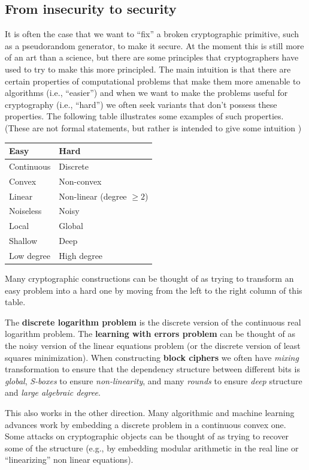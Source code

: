 \subsection{From insecurity to
security}\label{From-insecurity-to-security}

It is often the case that we want to ``fix'' a broken cryptographic
primitive, such as a pseudorandom generator, to make it secure. At the
moment this is still more of an art than a science, but there are some
principles that cryptographers have used to try to make this more
principled. The main intuition is that there are certain properties of
computational problems that make them more amenable to algorithms (i.e.,
``easier'') and when we want to make the problems useful for
cryptography (i.e., ``hard'') we often seek variants that don't possess
these properties. The following table illustrates some examples of such
properties. (These are not formal statements, but rather is intended to
give some intuition )

\begin{longtable}[]{@{}ll@{}}
\toprule
Easy & Hard\tabularnewline
\midrule
\endhead
Continuous & Discrete\tabularnewline
Convex & Non-convex\tabularnewline
Linear & Non-linear (degree \(\geq 2\))\tabularnewline
Noiseless & Noisy\tabularnewline
Local & Global\tabularnewline
Shallow & Deep\tabularnewline
Low degree & High degree\tabularnewline
\bottomrule
\end{longtable}

Many cryptographic constructions can be thought of as trying to
transform an easy problem into a hard one by moving from the left to the
right column of this table.

The \textbf{discrete logarithm problem} is the discrete version of the
continuous real logarithm problem. The \textbf{learning with errors
problem} can be thought of as the noisy version of the linear equations
problem (or the discrete version of least squares minimization). When
constructing \textbf{block ciphers} we often have \emph{mixing}
transformation to ensure that the dependency structure between different
bits is \emph{global}, \emph{S-boxes} to ensure \emph{non-linearity},
and many \emph{rounds} to ensure \emph{deep} structure and \emph{large
algebraic degree}.

This also works in the other direction. Many algorithmic and machine
learning advances work by embedding a discrete problem in a continuous
convex one. Some attacks on cryptographic objects can be thought of as
trying to recover some of the structure (e.g., by embedding modular
arithmetic in the real line or ``linearizing'' non linear equations).

